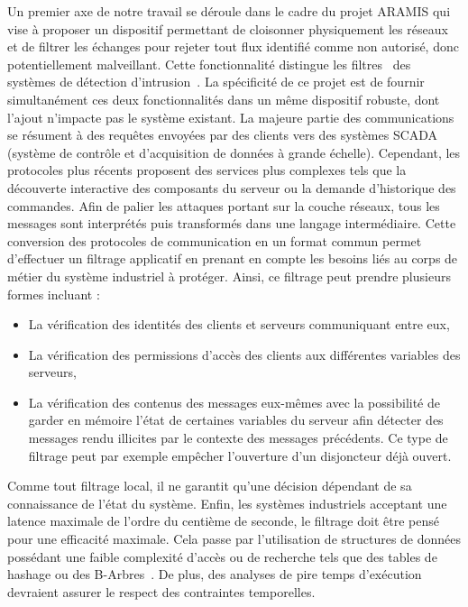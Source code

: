 \documentclass{article}
\newcommand{\aramis}{ARAMIS\xspace}
\begin{document}
Un premier axe de notre travail se déroule dans le cadre du projet \aramis{}
\cite{aramis} qui vise à proposer un dispositif permettant de cloisonner
physiquement les réseaux et de filtrer les échanges pour rejeter tout flux
identifié comme non autorisé, donc potentiellement malveillant.
Cette fonctionnalité distingue les filtres~\cite{DESIRE10,StoneGate11,rWeb13,
DZNetwork14} des systèmes de détection d'intrusion~\cite{StoneGate13,Pax99,
Suricata,Snort}.
La spécificité de ce projet est de fournir simultanément ces deux
fonctionnalités dans un même dispositif robuste, dont l'ajout n'impacte pas le
système existant.
La majeure partie des communications se résument à des requêtes envoyées par des
clients vers des systèmes SCADA (système de contrôle et d'acquisition de données
à grande échelle).
Cependant, les protocoles plus récents proposent des services plus complexes
tels que la découverte interactive des composants du serveur ou la demande
d'historique des commandes.
Afin de palier les attaques portant sur la couche réseaux, tous les messages
sont interprétés puis transformés dans une langage intermédiaire.
Cette conversion des protocoles de communication en un format commun permet
d'effectuer un filtrage applicatif en prenant en compte les besoins liés au
corps de métier du système industriel à protéger.
Ainsi, ce filtrage peut prendre plusieurs formes incluant :
\begin{itemize}
    \item La vérification des identités des clients et serveurs communiquant
        entre eux,
    \item La vérification des permissions d'accès des clients aux différentes
        variables des serveurs,
    \item La vérification des contenus des messages eux-mêmes avec la
        possibilité de garder en mémoire l'état de certaines variables du
        serveur afin détecter des messages rendu illicites par le contexte des
        messages précédents.
        Ce type de filtrage peut par exemple empêcher l'ouverture d'un
        disjoncteur déjà ouvert.
\end{itemize}

Comme tout filtrage local, il ne garantit qu'une décision dépendant de sa
connaissance de l'état du système.
Enfin, les systèmes industriels acceptant une latence maximale de l'ordre du
centième de seconde, le filtrage doit être pensé pour une efficacité maximale.
Cela passe par l'utilisation de structures de données possédant une faible 
complexité d'accès ou de recherche tels que des tables de hashage ou des
B-Arbres~\cite{Bay71}.
De plus, des analyses de pire temps d'exécution devraient assurer le respect
des contraintes temporelles.
\end{document}
